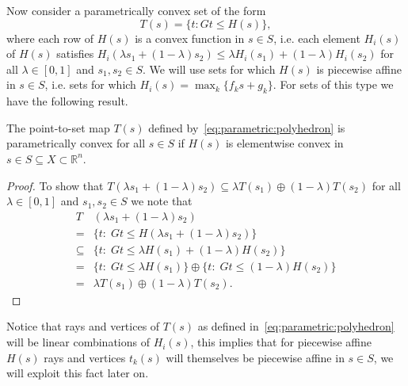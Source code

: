 %
Now consider a parametrically convex set of the form
%
\begin{equation}\label{eq:parametric:polyhedron}
	T(s)=\{t:Gt\leq H(s)\},
\end{equation}
%
where each row of $H(s)$ is a convex function in $s\in S$, i.e. each element $H_i(s)$ of 
$H(s)$ satisfies $H_i(\lambda s_1+(1-\lambda)s_2)\leq \lambda H_i(s_1)+(1-\lambda)H_i(s_2)$ 
for all $\lambda\in[0,1]$ and $s_1, s_2\in S$. 
%
We will use sets for which $H(s)$ is piecewise affine in $s\in S$, i.e. sets
for which $H_i(s) = \max_k\{f_k s + g_k\}$.
%
For sets of this type we have the following result.
%
\begin{thm}\label{thm:convex:parametric:set}
  The point-to-set map $T(s)$ defined by~\eqref{eq:parametric:polyhedron} is parametrically 
  convex for all $s\in S$ if $H(s)$ is elementwise convex in $s\in S\subseteq X \subset 
  \mathbb R^n$.
\end{thm}
%
\begin{proof}
To show that $T(\lambda s_1 + (1-\lambda)s_2)\subseteq \lambda T(s_1) \oplus(1-\lambda)
T(s_2)$ for all $\lambda \in [0,1]$ and $s_1, s_2\in S$ we note that
%
\begin{equation}
\begin{aligned}
  T&(\lambda s_1 + (1-\lambda)s_2)\\
  =& \{t:\; G t \leq H(\lambda s_1 + (1-\lambda)s_2)\}\\
  \subseteq& \{t:\;Gt\leq\lambda H(s_1)+(1-\lambda) H(s_2)\}\\
  =&\{t:\;Gt\leq\lambda H(s_1)\}\oplus\{t:\;Gt\leq(1-\lambda)H(s_2)\}\\
  =&\lambda T(s_1)\oplus(1-\lambda) T(s_2).
  \end{aligned}
\end{equation}
%
\end{proof} 
%
Notice that rays and vertices of $T(s)$ as defined in~\eqref{eq:parametric:polyhedron} will
be linear combinations of $H_i(s)$, this implies that for piecewise affine $H(s)$ rays
and vertices $t_k(s)$ will themselves be piecewise affine in $s\in S$, we will exploit
this fact later on.
%
%
%
%
%
